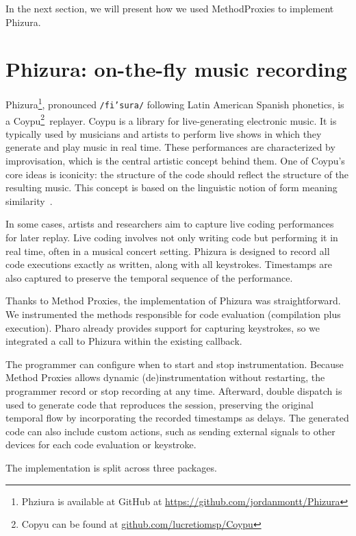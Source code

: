 \documentclass[
]{ceurart}
\begin{document}
In the next section, we will present how we used MethodProxies to implement Phizura.

\section{Phizura: on-the-fly music recording}

Phizura\footnote{Phziura is available at GitHub at \url{https://github.com/jordanmontt/Phizura}}, pronounced \texttt{/fi'su\*ra/} following Latin American Spanish phonetics, is a Coypu\footnote{Copyu can be found at \url{github.com/lucretiomsp/Coypu}}\ replayer.
Coypu is a library for live-generating electronic music.
It is typically used by musicians and artists to perform live shows in which they generate and play music in real time.
These performances are characterized by improvisation, which is the central artistic concept behind them.
One of Coypu's core ideas is iconicity: the structure of the code should reflect the structure of the resulting music.
This concept is based on the linguistic notion of form meaning similarity~\cite{Haim85a, Comr81a}.

In some cases, artists and researchers aim to capture live coding performances~\cite{Nils07a} for later replay.
Live coding involves not only writing code but performing it in real time, often in a musical concert setting.
Phizura is designed to record all code executions exactly as written, along with all keystrokes.
Timestamps are also captured to preserve the temporal sequence of the performance.

Thanks to Method Proxies, the implementation of Phizura was straightforward. 
We instrumented the methods responsible for code evaluation (compilation plus execution). 
Pharo already provides support for capturing keystrokes, so we integrated a call to Phizura within the existing callback. 

The programmer can configure when to start and stop instrumentation. 
Because Method Proxies allows dynamic (de)instrumentation without restarting, the programmer record or stop recording at any time.
Afterward, double dispatch is used to generate code that reproduces the session, preserving the original temporal flow by incorporating the recorded timestamps as delays.
The generated code can also include custom actions, such as sending external signals to other devices for each code evaluation or keystroke.

The implementation is split across three packages.
\end{document}

